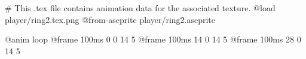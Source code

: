 # This .tex file contains animation data for the associated texture.
@load player/ring2.tex.png
@from-aseprite player/ring2.aseprite

@anim loop
	@frame 100ms 0 0 14 5
	@frame 100ms 14 0 14 5
	@frame 100ms 28 0 14 5
